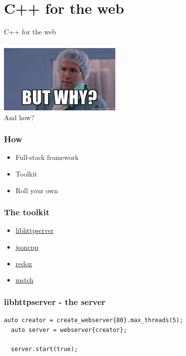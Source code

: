 \section{C++ for the web}
\begin{frame}
  \begin{center}
    \huge C++ for the web
  \end{center}
\end{frame}
\begin{frame}
  \frametitle{}
  \begin{center}
    \includegraphics[width=6cm]{images/why}
    \\ And how?
  \end{center}
\end{frame}
\begin{frame}
  \frametitle{How}
  \begin{itemize}
    \item Full-stack framework
    \item Toolkit
    \item Roll your own
  \end{itemize}
\end{frame}
\begin{frame}
  \frametitle{The toolkit}
  \begin{itemize}
    \item \href{https://github.com/etr/libhttpserver}{libhttpserver}
    \item \href{https://github.com/open-source-parsers/jsoncpp}{jsoncpp}
    \item \href{https://github.com/hmartiro/redox}{redox}
    \item \href{https://github.com/no1msd/mstch}{mstch}
  \end{itemize}
\end{frame}
\begin{frame}[fragile]
  \frametitle{libhttpserver - the server}
  \begin{lstlisting}[language={[11]C++}]
  auto creator = create_webserver{80}.max_threads(5);
  auto server = webserver{creator};

  server.start(true);
  \end{lstlisting}
\end{frame}
